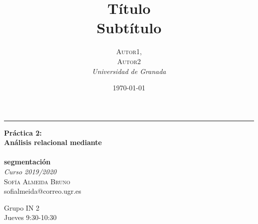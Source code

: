 \documentclass[a4paper, 20pt]{article}
\title{\textbf{Título}\\ %
Subtítulo} %
\author{\textsc{Autor1,\\Autor2} %
\\{\textit{Universidad de Granada}}} %
\date{\today} %
\begin{document}

\begin{titlepage} %
	
	\raggedleft %
	
	\rule{1pt}{\textheight} %
	\hspace{0.05\textwidth} %
	\parbox[b]{0.8\textwidth}{ %
		
		{\Huge\bfseries Práctica 2:\\[0.5\baselineskip] Análisis relacional mediante\\ \\ segmentación}\\[2\baselineskip] %
		{\large\textit{Curso 2019/2020}}\\[4\baselineskip] %
		{\Large\textsc{Sofía Almeida Bruno}\\[0.5\baselineskip]sofialmeida@correo.ugr.es} %
		
		\vspace{0.4\textheight} %
		
		{\noindent Grupo IN 2\\[0.5\baselineskip] Jueves 9:30-10:30}\\[\baselineskip] %
	}

\end{titlepage}


\end{document}

